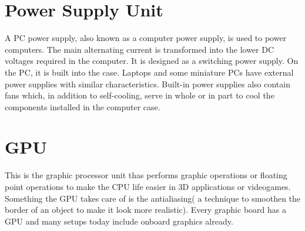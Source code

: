\documentclass[a4paper,12pt]{article}
\begin{document}
\section{Power Supply Unit}

A PC power supply, also known as a computer power supply, is used to power computers. The main alternating current is transformed into the lower DC voltages required in the computer. It is designed as a switching power supply. On the PC, it is built into the case.  Laptops and some miniature PCs have external power supplies with similar characteristics. Built-in power supplies also contain fans which, in addition to self-cooling, serve in whole or in part to cool the components installed in the computer case. 

\section{GPU}
This is the graphic processor unit thas performs graphic operations or floating point operations to make the CPU life easier in 3D applications or videogames.  Something the GPU takes care of is the antialiasing( a technique to smoothen the border of an object to make it look more realistic). Every graphic board has a GPU and many setups today include onboard graphics already.

\printindex
\end{document}
